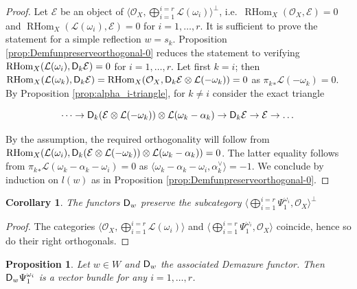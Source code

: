 \documentclass[sn-mathphys-num]{sn-jnl}%
\newcommand{\Oo}{\mathcal O}
\newcommand{\Ee}{\mathcal E}
\newcommand{\Ll}{\mathcal L}
\newcommand*{\RHom}{\mathop{\mathrm {RHom}}\nolimits}
\newcommand{\sd}{\sf D}
\newtheorem{corollary}[theorem]{Corollary}
\newtheorem{proposition}[theorem]{Proposition}
\theoremstyle{definition}
\begin{document}
\begin{proof}
Let $\Ee$ be an object of $\langle \Oo _{X},  \bigoplus _{i=1}^{i=r}\Ll(\omega _i)\rangle ^{\perp}$, i.e.\ $\RHom _X(\Oo _{X},\Ee)=0$ and $\RHom _X(\Ll (\omega _i),\Ee)=0$ for $i=1,\dots ,r$. It is sufficient to prove the statement for a simple reflection $w=s_k$. Proposition \ref{prop:Demfunpreserveorthogonal-0} reduces the statement to verifying 
$\RHom _X(\Ll (\omega _i),{\sd}_k\Ee)=0$ for $i=1,\dots ,r$. Let first $k=i$; 
then $\RHom _X(\Ll (\omega _k),{\sd}_k\Ee)=\RHom _X(\Oo _X,{\sd}_k\Ee\otimes \Ll (-\omega _k))=0$ as ${\pi _k}_{\ast}\Ll (-\omega _k)=0$. By Proposition \ref{prop:alpha_i-triangle}, for $k\neq i$ consider the exact triangle 	

$$
\dots \rightarrow {\sd }_k(\Ee \otimes \Ll (-\omega _k))\otimes \Ll (\omega _k-\alpha_k)\rightarrow {\sd}_k\Ee\rightarrow \Ee \rightarrow \dots 
$$

By the assumption, the required orthogonality will follow from $\RHom _X(\Ll (\omega _i),{\sd }_k(\Ee \otimes \Ll (-\omega _k))\otimes \Ll (\omega _k-\alpha_k))=0$. The latter equality follows from ${\pi _k}_{\ast}\Ll (\omega _k-\alpha _k-\omega _i)=0$ as $\langle \omega _k-\alpha _k-\omega _i,\alpha _k^{\vee}\rangle =-1$. We conclude by induction on $l(w)$ as in Proposition \ref{prop:Demfunpreserveorthogonal-0}.
\end{proof}

\begin{corollary}\label{cor:Demazure_preserve_rightperpO}
The functors ${\sd}_w$ preserve the subcategory $\langle \bigoplus _{i=1}^{i=r}\Psi _1^{\omega _i}, \Oo _{X}\rangle ^{\perp}$
\end{corollary}

\begin{proof}
The categories $\langle \Oo _{X}, \bigoplus _{i=1}^{i=r}\Ll(\omega _i)\rangle$ and $\langle \bigoplus _{i=1}^{i=r}\Psi _1^{\omega _i}, \Oo _{X}\rangle$ coincide, hence so do their right orthogonals.
\end{proof}

\begin{proposition}\label{prop:purity_D_iPsi_i}
Let $w\in W$ and ${\sd }_w$ the associated Demazure functor. Then ${\sd }_w\Psi _1^{\omega _i}$ is a vector bundle for any $i=1,\dots, r$.
\end{proposition}
\end{document}
